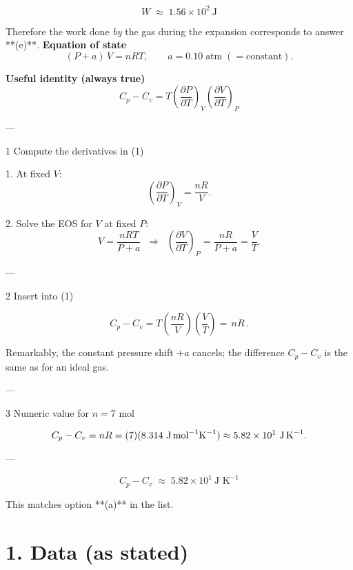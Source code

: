 \documentclass[12pt]{article}
\theoremstyle{definition} %
\theoremstyle{plain} %
\begin{document}
\[
\boxed{W \;\approx\; 1.56\times10^{2}\ \text{J}}
\]

\bigskip
Therefore the work done \emph{by} the gas during the expansion corresponds to answer **(e)**.
\textbf{Equation of state}
\[
 (P+a)\,V = nRT, \qquad  a = 0.10\;\text{atm}\;(=\text{constant}).
\]

\textbf{Useful identity (always true)}
\[
\boxed{\;
  C_p - C_v
  = T\left(\frac{\partial P}{\partial T}\right)_{V}
      \left(\frac{\partial V}{\partial T}\right)_{P}
\;}
\tag{1}
\]

---

1  Compute the derivatives in (1)

1.  At fixed \(V\):
    \[
      \left(\frac{\partial P}{\partial T}\right)_{V}
      = \frac{nR}{V}.
    \]

2.  Solve the EOS for \(V\) at fixed \(P\):
    \[
      V = \frac{nRT}{P+a}
      \;\;\Longrightarrow\;\;
      \left(\frac{\partial V}{\partial T}\right)_{P}
      = \frac{nR}{P+a}
      = \frac{V}{T}.
    \]

---

2  Insert into (1)

\[
C_p - C_v
  = T\left(\frac{nR}{V}\right)\!\left(\frac{V}{T}\right)
  = \boxed{\,nR\,}.
\]

Remarkably, the constant pressure shift \(+a\) cancels; the
difference \(C_p-C_v\) is the same as for an ideal gas.

---

3  Numeric value for \(n = 7\) mol

\[
C_p - C_v = nR = (7)(8.314\ \text{J\,mol}^{-1}\text{K}^{-1})
           \approx 5.82\times10^{1}\ \text{J\,K}^{-1}.
\]

---

\[
\boxed{C_p - C_v \;\approx\; 5.82 \times 10^{1}\ \text{J K}^{-1}}
\]

This matches option **(a)** in the list.

\section*{1.  Data (as stated)}
\end{document}
